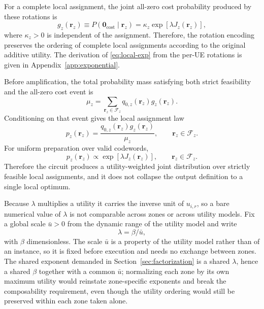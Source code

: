 \documentclass[journal]{IEEEtran}
\newcommand{\calF}{\mathcal{F}}  %
\begin{document}
For a complete local assignment, the joint all-zero cost probability produced by these rotations is
\begin{equation}
\label{eq:local-exp}
g_z(\bm r_z)
\equiv
P(\bm 0_{\mathrm{cost}}\mid\bm r_z)
=
\kappa_z\exp[\lambda J_z(\bm r_z)],
\end{equation}
where $\kappa_z>0$ is independent of the assignment. Therefore, the rotation encoding preserves the ordering of complete local assignments according to the original additive utility. The derivation of \eqref{eq:local-exp} from the per-UE rotations is given in Appendix~\ref{app:exponential}.

Before amplification, the total probability mass satisfying both strict feasibility and the all-zero cost event is
\begin{equation}
\label{eq:mu}
\mu_z=
\sum_{\bm r_z\in\calF_z}
q_{0,z}(\bm r_z)g_z(\bm r_z).
\end{equation}
Conditioning on that event gives the local assignment law
\begin{equation}
\label{eq:conditional-distribution}
p_z(\bm r_z)=
\frac{q_{0,z}(\bm r_z)g_z(\bm r_z)}{\mu_z},
\qquad
\bm r_z\in\calF_z.
\end{equation}
For uniform preparation over valid codewords,
\begin{equation}
\label{eq:gibbs-local}
p_z(\bm r_z)\propto
\exp[\lambda J_z(\bm r_z)],
\qquad
\bm r_z\in\calF_z.
\end{equation}
Therefore the circuit produces a utility-weighted joint distribution over strictly feasible local assignments, and it does not collapse the output definition to a single local optimum.

Because $\lambda$ multiplies a utility it carries the inverse unit of $u_{i,r}$, so a bare numerical value of $\lambda$ is not comparable across zones or across utility models. Fix a global scale $\bar u>0$ from the dynamic range of the utility model and write
\[
\lambda=\beta/\bar u ,
\]
with $\beta$ dimensionless. The scale $\bar u$ is a property of the utility model rather than of an instance, so it is fixed before execution and needs no exchange between zones. The shared exponent demanded in Section~\ref{sec:factorization} is a shared $\lambda$, hence a shared $\beta$ together with a common $\bar u$; normalizing each zone by its own maximum utility would reinstate zone-specific exponents and break the composability requirement, even though the utility ordering would still be preserved within each zone taken alone.
\end{document}
